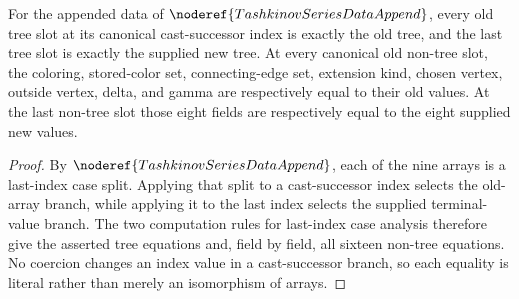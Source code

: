 \begin{lemma}
For the appended data of \(\noderef{TashkinovSeriesDataAppend}\), every old
tree slot at its canonical cast-successor index is exactly the old tree, and
the last tree slot is exactly the supplied new tree.  At every canonical old
non-tree slot, the coloring, stored-color set, connecting-edge set, extension
kind, chosen vertex, outside vertex, delta, and gamma are respectively equal
to their old values.  At the last non-tree slot those eight fields are
respectively equal to the eight supplied new values.
\end{lemma}
\begin{proof}
By \(\noderef{TashkinovSeriesDataAppend}\), each of the nine arrays is a
last-index case split.  Applying that split to a cast-successor index selects
the old-array branch, while applying it to the last index selects the supplied
terminal-value branch.  The two computation rules for last-index case
analysis therefore give the asserted tree equations and, field by field, all
sixteen non-tree equations.  No coercion changes an index value in a
cast-successor branch, so each equality is literal rather than merely an
isomorphism of arrays.
\end{proof}
